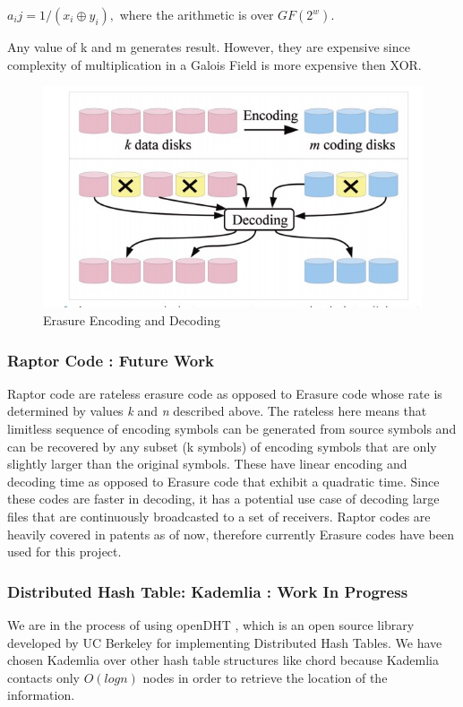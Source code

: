 \documentclass[conference]{IEEEtran}
\begin{document}
$a_ij = 1/(x_i \oplus y_i),$
where the arithmetic is over $GF(2^w)$.

Any value of k and m generates result. However, they are expensive since
complexity of multiplication in a Galois Field \cite{gfcomplete} is more expensive then XOR. 

\begin{figure}
    \includegraphics[width=.8\columnwidth]{files/erasure.png}
    \centering
    \caption{Erasure Encoding and Decoding }
    \label{image: fig3}
\end{figure}

\subsubsection{Raptor Code \cite{raptor} : Future Work}
Raptor code are rateless erasure code as opposed to Erasure code whose rate is determined by
values \textit{k} and \textit{n} described above. The rateless here means that limitless sequence of encoding
symbols can be generated from source symbols and can be recovered by any subset (k symbols) of 
encoding symbols that are only slightly larger than the original symbols. These have linear encoding and decoding time
as opposed to Erasure code that exhibit a quadratic time. 
Since these codes are faster in decoding, it has a potential use case of decoding large files that are continuously
broadcasted to a set of receivers.
Raptor codes are heavily covered in patents as of now, therefore currently Erasure codes have been used for this project.



\subsubsection{Distributed Hash Table: Kademlia : Work In Progress }
We are in the process of using openDHT \cite{opendht}, which is an open source library
developed by UC Berkeley for implementing Distributed Hash Tables. We have chosen Kademlia over other
hash table structures like chord because Kademlia contacts only $O(log n)$ nodes in order
to retrieve the location of the information.
\end{document}
